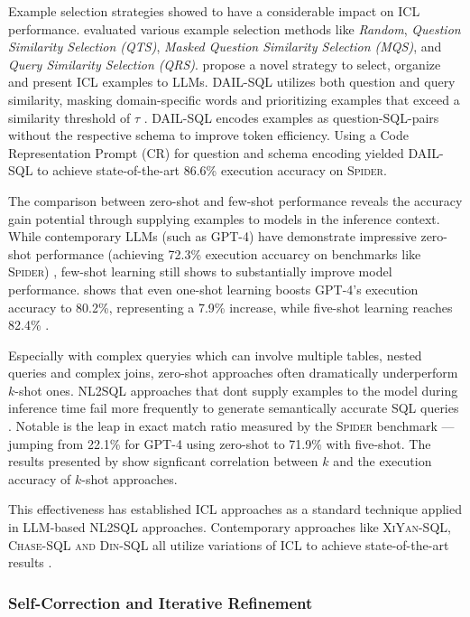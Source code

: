 Example selection strategies showed to have a considerable impact on ICL performance. \cite{DAIL-SQL} evaluated
various example selection methods like \textit{Random}, \textit{Question Similarity Selection (QTS)}, 
\textit{Masked Question Similarity Selection (MQS)}, and \textit{Query Similarity Selection (QRS)}. \citeauthor*{DAIL-SQL}
propose a novel strategy to select, organize and present ICL examples to LLMs. DAIL-SQL utilizes both question and
query similarity, masking domain-specific words and prioritizing examples that exceed a similarity threshold of $\tau$
\citep[p.~5]{DAIL-SQL}. DAIL-SQL encodes examples as question-SQL-pairs without the respective schema to improve
token efficiency. Using a Code Representation Prompt (CR) for question and schema encoding yielded DAIL-SQL to achieve
state-of-the-art 86.6\% execution accuracy on \textsc{Spider}.

The comparison between zero-shot and few-shot performance reveals the accuracy gain potential through supplying examples
to models in the inference context. While contemporary LLMs (such as GPT-4) have demonstrate impressive zero-shot performance
(achieving 72.3\% execution accuarcy on benchmarks like \textsc{Spider}) \citep[Table 1, p.~8]{DAIL-SQL}, few-shot learning 
still shows to substantially improve model performance. \cite{DAIL-SQL} shows that even one-shot learning boosts GPT-4's
execution accuracy to 80.2\%, representing a 7.9\% increase, while five-shot learning reaches 82.4\% \citep[Table 2, p.~8]{DAIL-
SQL}. 

Especially with complex queryies which can involve multiple tables, nested queries and complex joins, zero-shot approaches
often dramatically underperform $k$-shot ones. NL2SQL approaches that dont supply examples to the model during inference time
fail more frequently to generate semantically accurate SQL queries \citep{DAIL-SQL}. Notable is the leap in exact match ratio
measured by the \textsc{Spider} benchmark — jumping from 22.1\% for GPT-4 using zero-shot to 71.9\% with five-shot. The
results presented by \cite{DAIL-SQL} show signficant correlation between $k$ and the execution accuracy of $k$-shot approaches.

This effectiveness has established ICL approaches as a standard technique applied in LLM-based NL2SQL approaches. Contemporary
approaches like \textsc{XiYan-SQL, Chase-SQL and Din-SQL} all utilize variations of ICL to achieve state-of-the-art results
\citep{XiYan, CHASE, DINSQL}.

\subsubsection{Self-Correction and Iterative Refinement}

